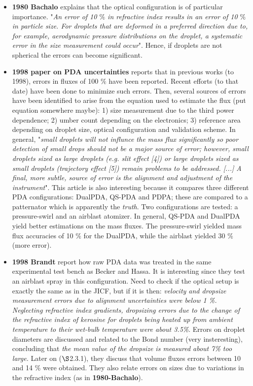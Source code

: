 \begin{itemize}

	\item \textbf{1980 Bachalo} explains that the optical configuration is of particular importance. "\textsl{An error of 10 $\%$ in refractive index results in an error of 10 $\%$ in particle size. For droplets that are deformed in a preferred direction due to, for example, aerodynamic pressure distributions on the droplet, a systematic error in the size measurement could occur}". Hence, if droplets are not spherical the errors can become significant.

	\item \textbf{1998 paper on PDA uncertainties} reports that in previous works (to 1998), errors in fluxes of 100 $\%$ have been reported. Recent efforts (to that date) have been done to minimize such errors. Then, several sources of errors have been identified to arise from the equation used to estimate the flux (put equation somewhere maybe): 1) size measurement due to the third power dependence; 2) umber count depending on the electronics; 3) reference area depending on droplet size, optical configuration and validation scheme. In general, "\textsl{small droplets will not influnce the mass flux significantly so poor detection of small drops should not be a major source of error; however, small droplets sized as large droplets (e.g. slit effect [4]) or large droplets sized as small droplets (trajectory effect [5]) remain problems to be addressed. [...] A final, more subtle, source of error is the alignment and adjustment of the instrument}". This article is also interesting because it compares three different PDA configurations: DualPDA, QS-PDA and PDPA; these are compared to a patternator which is apparently the \textsl{truth}. Two configurations are tested: a pressure-swirl and an airblast atomizer. In general, QS-PDA and DualPDA yield better estimations on the mass fluxes. The pressure-swirl yielded mass flux accuracies of 10 $\%$ for the DualPDA, while the airblast yielded 30 $\%$ (more error).
	
	\item \textbf{1998 Brandt} report how raw PDA data was treated in the same experimental test bench as Becker and Hassa. It is interesting since they test an airblast spray in this configuration. Need to check if the optical setup is exactly the same as in the JICF, but if it is then: \textsl{velocity and dropsize measurement errors due to alignment uncertainties were below 1 \%. Neglecting refractive index gradients, dropsizing errors due to the change of the refractive index of kerosine for droplets being heated up from ambient temperature to their wet-bulb temperature were about 3.5\%}. Errors on droplet diameters are discussed and related to the Bond number (very insteresting), concluding that \textsl{the mean value of the dropsize is measured about 7\% too large.} Later on ($\S$2.3.1), they discuss that volume fluxes errors between 10 and 14 \% were obtained. They also relate errors on sizes due to variations in the refractive index (as in \textbf{1980-Bachalo}). 
	

\end{itemize}
